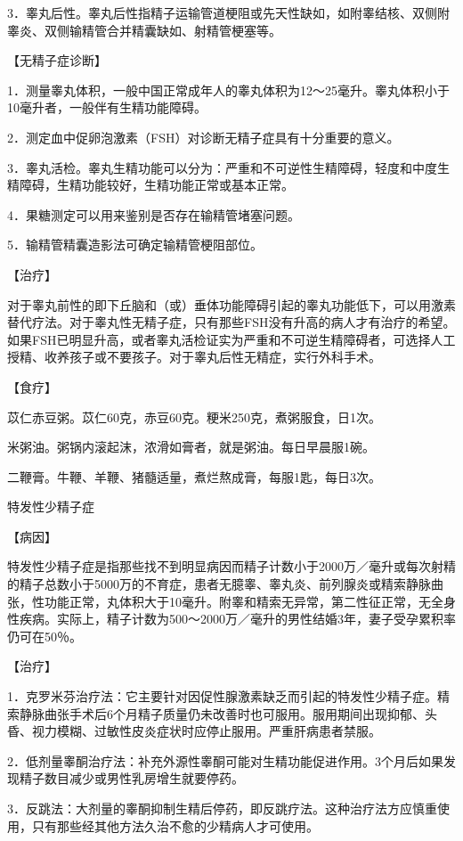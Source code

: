 \documentclass[12pt,UTF8,openany]{ctexbook}
\begin{document}
3．睾丸后性。睾丸后性指精子运输管道梗阻或先天性缺如，如附睾结核、双侧附睾炎、双侧输精管合并精囊缺如、射精管梗塞等。

【无精子症诊断】

1．测量睾丸体积，一般中国正常成年人的睾丸体积为12～25毫升。睾丸体积小于10毫升者，一般伴有生精功能障碍。

2．测定血中促卵泡激素（FSH）对诊断无精子症具有十分重要的意义。

3．睾丸活检。睾丸生精功能可以分为：严重和不可逆性生精障碍，轻度和中度生精障碍，生精功能较好，生精功能正常或基本正常。

4．果糖测定可以用来鉴别是否存在输精管堵塞问题。

5．输精管精囊造影法可确定输精管梗阻部位。

【治疗】

对于睾丸前性的即下丘脑和（或）垂体功能障碍引起的睾丸功能低下，可以用激素替代疗法。对于睾丸性无精子症，只有那些FSH没有升高的病人才有治疗的希望。如果FSH已明显升高，或者睾丸活检证实为严重和不可逆生精障碍者，可选择人工授精、收养孩子或不要孩子。对于睾丸后性无精症，实行外科手术。

【食疗】

苡仁赤豆粥。苡仁60克，赤豆60克。粳米250克，煮粥服食，日1次。

米粥油。粥锅内滚起沫，浓滑如膏者，就是粥油。每日早晨服1碗。

二鞭膏。牛鞭、羊鞭、猪髓适量，煮烂熬成膏，每服1匙，每日3次。





特发性少精子症


【病因】

特发性少精子症是指那些找不到明显病因而精子计数小于2000万／毫升或每次射精的精子总数小于5000万的不育症，患者无臆睾、睾丸炎、前列腺炎或精索静脉曲张，性功能正常，丸体积大于10毫升。附睾和精索无异常，第二性征正常，无全身性疾病。实际上，精子计数为500～2000万／毫升的男性结婚3年，妻子受孕累积率仍可在50％。

【治疗】

1．克罗米芬治疗法：它主要针对因促性腺激素缺乏而引起的特发性少精子症。精索静脉曲张手术后6个月精子质量仍未改善时也可服用。服用期间出现抑郁、头昏、视力模糊、过敏性皮炎症状时应停止服用。严重肝病患者禁服。

2．低剂量睾酮治疗法：补充外源性睾酮可能对生精功能促进作用。3个月后如果发现精子数目减少或男性乳房增生就要停药。

3．反跳法：大剂量的睾酮抑制生精后停药，即反跳疗法。这种治疗法方应慎重使用，只有那些经其他方法久治不愈的少精病人才可使用。
\end{document}
